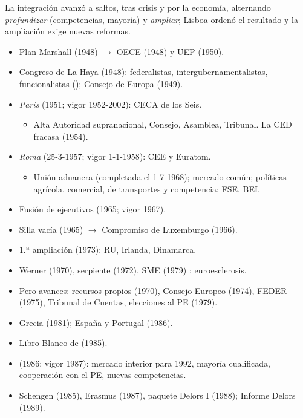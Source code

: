 \documentclass{article}
\begin{document}
\begin{columnas}
\begin{ideaclave}
La integración avanzó a saltos, tras crisis y por la economía, alternando \emph{profundizar} (competencias, mayoría) y \emph{ampliar}; Lisboa ordenó el resultado y la ampliación exige nuevas reformas.
\end{ideaclave}

\begin{itemize}
\item Plan Marshall (1948) $\to$ OECE (1948) y UEP (1950).
\item Congreso de La Haya (1948): federalistas, intergubernamentalistas, funcionalistas (); Consejo de Europa (1949).
\end{itemize}
\begin{itemize}
\item \emph{París} (1951; vigor 1952-2002): CECA de los Seis.
  \begin{itemize}
  \item Alta Autoridad supranacional, Consejo, Asamblea, Tribunal. La CED fracasa (1954).
  \end{itemize}
\item \emph{Roma} (25-3-1957; vigor 1-1-1958): CEE y Euratom.
  \begin{itemize}
  \item Unión aduanera (completada el 1-7-1968); mercado común; políticas agrícola, comercial, de transportes y competencia; FSE, BEI.
  \end{itemize}
\item Fusión de ejecutivos (1965; vigor 1967).
\item Silla vacía (1965) $\to$ Compromiso de Luxemburgo (1966).
\item 1.ª ampliación (1973): RU, Irlanda, Dinamarca.
\end{itemize}
\begin{itemize}
\item Werner (1970), serpiente (1972), SME (1979) ; euroesclerosis.
\item Pero avances: recursos propios (1970), Consejo Europeo (1974), FEDER (1975), Tribunal de Cuentas, elecciones al PE (1979).
\item Grecia (1981); España y Portugal (1986).
\end{itemize}
\begin{itemize}
\item Libro Blanco de  (1985).
\item {} (1986; vigor 1987): mercado interior para 1992, mayoría cualificada, cooperación con el PE, nuevas competencias.
\item Schengen (1985), Erasmus (1987), paquete Delors I (1988); Informe Delors (1989).
\end{itemize}


\end{columnas}
\end{document}

